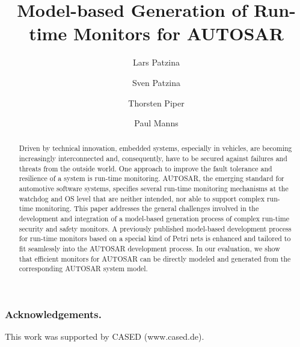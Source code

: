\documentclass{template/llncs}
\begin{document}
\mainmatter
\title{Model-based Generation of Run-time Monitors for AUTOSAR}
\author{Lars Patzina%
\and Sven Patzina
\and Thorsten Piper
\and Paul Manns}


\maketitle


\begin{abstract}
Driven by technical innovation, embedded systems, especially in vehicles, are becoming increasingly interconnected and, consequently, have to be secured against failures and threats from the outside world.
One approach to improve the fault tolerance and resilience of a system is run-time monitoring.
AUTOSAR, the emerging standard for automotive software systems, specifies several run-time monitoring mechanisms at the watchdog and OS level that are neither intended, nor able to support complex run-time monitoring.
This paper addresses the general challenges involved in the development and integration of a model-based generation process of complex run-time security and safety monitors.
A previously published model-based development process for run-time monitors based on a special kind of Petri nets is enhanced and tailored to fit seamlessly into the AUTOSAR development process.
In our evaluation, we show that efficient monitors for AUTOSAR can be directly modeled and generated from the corresponding AUTOSAR system model.
    

 
 
\end{abstract}






\subsubsection*{Acknowledgements.}
This work was supported by CASED (www.cased.de).




\end{document}
